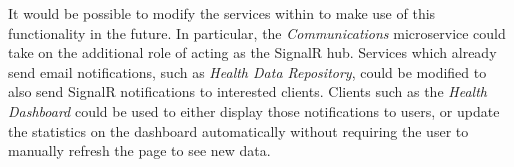 It would be possible to modify the services within  to make use of this functionality in the future. In particular, the \textit{Communications} microservice could take on the additional role of acting as the SignalR hub. Services which already send email notifications, such as \textit{Health Data Repository}, could be modified to also send SignalR notifications to interested clients. Clients such as the \textit{Health Dashboard} could be used to either display those notifications to users, or update the statistics on the dashboard automatically without requiring the user to manually refresh the page to see new data.
